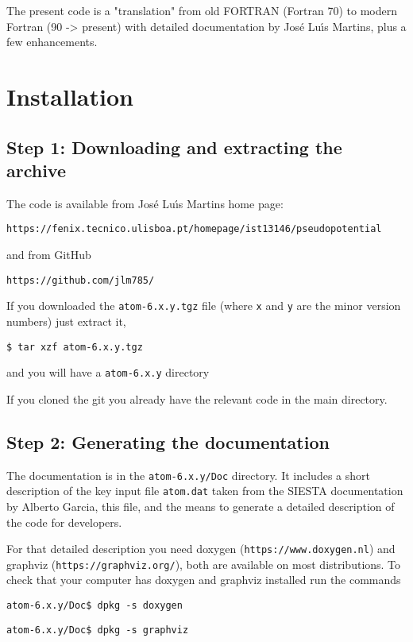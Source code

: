 \documentclass[11pt]{article}
\begin{document}
The present code is a "translation" from old FORTRAN (Fortran 70) to modern Fortran (90 -> present)
with detailed documentation by Jos\'e Lu\'{\i}s Martins, plus a few enhancements.

\section{Installation}
\label{sec:install}

\subsection{Step 1: Downloading and extracting the archive}
\label{sec:step1}

The code is available from Jos\'e Lu\'{\i}s Martins home page:

\noindent\texttt{https://fenix.tecnico.ulisboa.pt/homepage/ist13146/pseudopotential}

and from GitHub

\noindent\texttt{https://github.com/jlm785/}

If you downloaded the \texttt{atom-6.x.y.tgz} file (where \texttt{x} and \texttt{y}
are the minor version numbers) just extract it,

\noindent\texttt{\$ tar xzf atom-6.x.y.tgz}

and you will have a \texttt{atom-6.x.y} directory

If you cloned the git you already have the relevant code in the main directory.

\subsection{Step 2: Generating the documentation}
\label{sec:step2}

The documentation is in the \texttt{atom-6.x.y/Doc} directory.  It includes a short description of the key input file
\texttt{atom.dat} taken from the SIESTA documentation by Alberto Garcia, this file, and the means to generate a detailed
description of the code for developers.

For that detailed description you need doxygen (\texttt{https://www.doxygen.nl}) and
graphviz (\texttt{https://graphviz.org/}), both are
available on most distributions.  To check that your computer has doxygen and graphviz installed
run the commands

\noindent\texttt{atom-6.x.y/Doc\$ dpkg -s doxygen}

\noindent\texttt{atom-6.x.y/Doc\$ dpkg -s graphviz}
\end{document}
